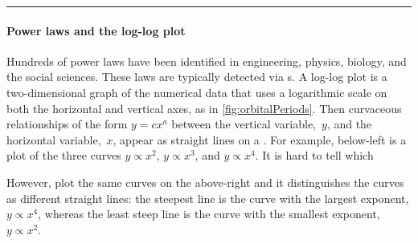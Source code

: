 \begin{table}
\hrule\smallskip
\begin{minipage}{\linewidth}
\paragraph{Power laws and the log-log plot}
Hundreds of power laws have been identified in engineering, physics, biology, and the social sciences.
These laws are typically detected via s.
A log-log plot is a two-dimensional graph of the numerical data that uses a logarithmic scale on both the horizontal and vertical axes, as in \cref{fig:orbitalPeriods}.
Then curvaceous relationships of the form $y=cx^a$ between the vertical variable,~$y$, and the horizontal variable,~$x$, appear as straight lines on a .
For example, below-left is a plot of the three curves $y\propto x^2$,  $y\propto x^3$, and  $y\propto x^4$.
It is hard to tell which 
\begin{center} 
 \hfil
{} 
\end{center}
However, plot the same curves on the above-right  and it  distinguishes the curves as different straight lines: the steepest line is the curve with the largest exponent, $y\propto x^4$, whereas the least steep line is the curve with the smallest exponent, $y\propto x^2$.


\end{minipage}
\end{table}
